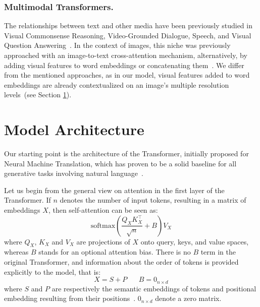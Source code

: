 \documentclass[runningheads]{llncs}
\begin{document}
\subsubsection{Multimodal Transformers.}
The relationships between text and other media have been previously studied in Visual Commonsense Reasoning, Video-Grounded Dialogue, Speech, and Visual Question Answering~\cite{han2021survey,le-etal-2019-multimodal,DBLP:journals/corr/abs-1910-11559}. In the context of images, this niche was previously approached with an image-to-text cross-attention mechanism, alternatively, by adding visual features to word embeddings or concatenating them~\cite{9037732,lee2018stacked,li2019visualbert,Su2020VL-BERT,xu2020layoutlm}. 
We differ from the mentioned approaches, as in our model, visual features added to word embeddings are already contextualized on an image's multiple resolution levels~(see Section \ref{sec:arch}). 


\section{Model Architecture}\label{sec:arch}
Our starting point is the architecture of the Transformer, initially proposed for Neural Machine Translation, which has proven to be a solid baseline for all generative tasks involving natural language~\cite{transformer}.

Let us begin from the general view on attention in the first layer of the Transformer.
If $n$ denotes the number of input tokens, resulting in a matrix of embeddings $X$, then self-attention can be seen as:
\begin{equation}
\text{softmax}\left(\frac{Q_X K_X^\top}{\sqrt{n}} + B\right) V_X
\end{equation}
\noindent where $Q_X$, $K_X$ and $V_X$ are projections of $X$ onto query, keys, and value spaces, whereas $B$ stands for an optional attention bias.
There is no $B$ term in the original Transformer, and information about the order of tokens is provided explicitly to the model, that is:
$$X = S + P \hspace{20pt} B = 0_{n\times d}$$
where $S$ and $P$ are respectively the semantic embeddings of tokens and positional embedding resulting from their positions~\cite{transformer}. $0_{n\times d}$ denote a zero matrix.
\end{document}
